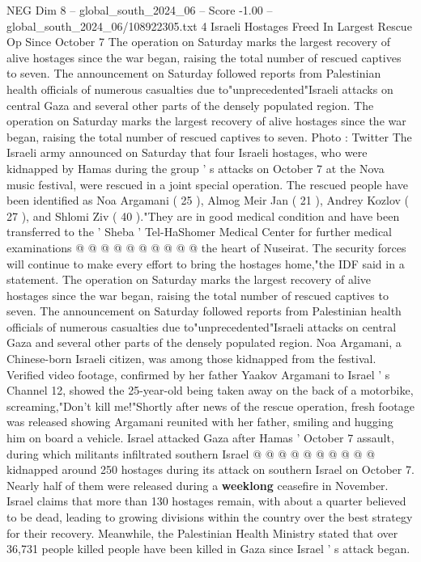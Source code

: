 \begin{textsample}{NEG Dim 8 – global\_south\_2024\_06 – Score -1.00 – global\_south\_2024\_06/108922305.txt}  \label{ex:f8_neg_041}
4 Israeli Hostages Freed In Largest Rescue Op Since October 7 The operation on Saturday marks the largest recovery of alive hostages since the war began, raising the total number of rescued captives to seven.
The announcement on Saturday followed reports from Palestinian health officials of numerous casualties due to"unprecedented"Israeli attacks on central Gaza and several other parts of the densely populated region.
The operation on Saturday marks the largest recovery of alive hostages since the war began, raising the total number of rescued captives to seven.
Photo : Twitter The Israeli army announced on Saturday that four Israeli hostages, who were kidnapped by Hamas during the group ' s attacks on October 7 at the Nova music festival, were rescued in a joint special operation.
The rescued people have been identified as Noa Argamani ( 25 ), Almog Meir Jan ( 21 ), Andrey Kozlov ( 27 ), and Shlomi Ziv ( 40 )."They are in good medical condition and have been transferred to the ' Sheba ' Tel-HaShomer Medical Center for further medical examinations @ @ @ @ @ @ @ @ @ @ the heart of Nuseirat.
The security forces will continue to make every effort to bring the hostages home,"the IDF said in a statement.
The operation on Saturday marks the largest recovery of alive hostages since the war began, raising the total number of rescued captives to seven.
The announcement on Saturday followed reports from Palestinian health officials of numerous casualties due to"unprecedented"Israeli attacks on central Gaza and several other parts of the densely populated region.
Noa Argamani, a Chinese-born Israeli citizen, was among those kidnapped from the festival.
Verified video footage, confirmed by her father Yaakov Argamani to Israel ' s Channel 12, showed the 25-year-old being taken away on the back of a motorbike, screaming,"Don't kill me!"Shortly after news of the rescue operation, fresh footage was released showing Argamani reunited with her father, smiling and hugging him on board a vehicle.
Israel attacked Gaza after Hamas ' October 7 assault, during which militants infiltrated southern Israel @ @ @ @ @ @ @ @ @ @ kidnapped around 250 hostages during its attack on southern Israel on October 7.
Nearly half of them were released during a \textbf{weeklong} ceasefire in November.
Israel claims that more than 130 hostages remain, with about a quarter believed to be dead, leading to growing divisions within the country over the best strategy for their recovery.
Meanwhile, the Palestinian Health Ministry stated that over 36,731 people killed people have been killed in Gaza since Israel ' s attack began.

\end{textsample}
